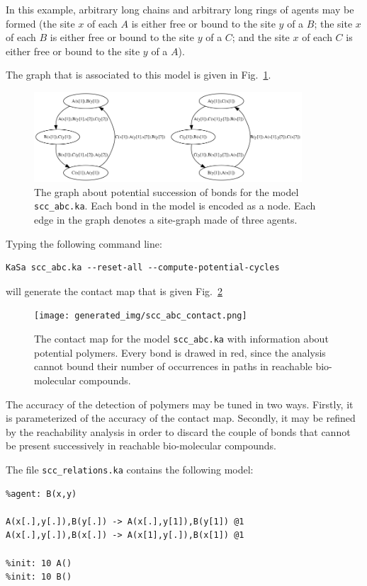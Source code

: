 \documentclass[11pt]{book}
\begin{document}
In this example, arbitrary long chains and arbitrary long rings of agents may be formed (the site $x$ of each $A$ is either free or bound to the site $y$ of a $B$;  the site $x$ of each $B$ is either free or bound to the site $y$ of a $C$; and the site $x$ of each $C$ is either free or bound to the site $y$ of a $A$).

The graph that is associated to this model is given in Fig.~\ref{fig:scc-graph}.
\begin{figure}[htbp]
\centering
\includegraphics[width=10cm]{img/graph.png}
\caption{The graph about potential succession of bonds for the model \texttt{scc\_abc.ka}. Each bond in the model is encoded as a node. Each edge in the graph denotes a site-graph made of three agents.  }
\label{fig:scc-graph}
\end{figure}

Typing the following command line:
\begin{verbatim}
KaSa scc_abc.ka --reset-all --compute-potential-cycles
\end{verbatim}
will generate the contact map that is given Fig.~\ref{fig:cm-scc-abc}

\begin{figure}[htbp]
\centering
\texttt{[image: generated\_img/scc\_abc\_contact.png]}
\caption{The contact map for the model \texttt{scc\_abc.ka} with information about potential polymers. Every bond is drawed in red, since the analysis cannot bound their number of occurrences in paths in reachable bio-molecular compounds.}
\label{fig:cm-scc-abc}
\end{figure}

The accuracy of the detection of polymers may be tuned in two ways.
Firstly, it is parameterized of the accuracy of the contact map. Secondly, it may be refined by the reachability analysis in order to discard the couple of bonds that cannot be present successively in reachable bio-molecular compounds.

The file \texttt{scc\_relations.ka} contains the following model:
\begin{lstlisting}[language=kappa]
%agent: A(x,y)
%agent: B(x,y)

A(x[.],y[.]),B(y[.]) -> A(x[.],y[1]),B(y[1]) @1
A(x[.],y[.]),B(x[.]) -> A(x[1],y[.]),B(x[1]) @1

%init: 10 A()
%init: 10 B()
\end{lstlisting}
\end{document}
